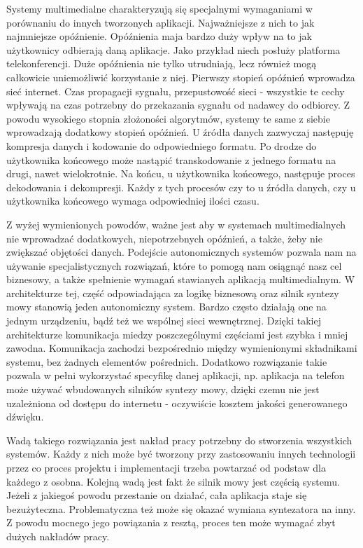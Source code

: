 Systemy multimedialne charakteryzują się specjalnymi wymaganiami w porównaniu do innych tworzonych aplikacji. Najważniejsze z nich to jak najmniejsze opóźnienie. Opóźnienia maja bardzo duży wpływ na to jak użytkownicy odbierają daną aplikacje. Jako przykład niech posłuży platforma telekonferencji. Duże opóźnienia nie tylko utrudniają, lecz również mogą całkowicie uniemożliwić korzystanie z niej. Pierwszy stopień opóźnień wprowadza sieć internet. Czas propagacji sygnału, przepustowość sieci - wszystkie te cechy wpływają na czas potrzebny do przekazania sygnału od nadawcy do odbiorcy. Z powodu wysokiego stopnia złożoności algorytmów, systemy te same z siebie wprowadzają dodatkowy stopień opóźnień. U źródła danych zazwyczaj następuję kompresja danych i kodowanie do odpowiedniego formatu. Po drodze do użytkownika końcowego może nastąpić transkodowanie z jednego formatu na drugi, nawet wielokrotnie. Na końcu, u użytkownika końcowego, następuje proces dekodowania i dekompresji. Każdy z tych procesów czy to u źródła danych, czy u użytkownika końcowego wymaga odpowiedniej ilości czasu. 

Z wyżej wymienionych powodów, ważne jest aby w systemach multimedialnych nie wprowadzać dodatkowych, niepotrzebnych opóźnień, a także, żeby nie zwiększać objętości danych. Podejście autonomicznych systemów pozwala nam na używanie specjalistycznych rozwiązań, które to pomogą nam osiągnąć nasz cel biznesowy, a także spełnienie wymagań stawianych aplikacją multimedialnym. W architekturze tej, część odpowiadająca za logikę biznesową oraz silnik syntezy mowy stanowią jeden autonomiczny system. Bardzo często działają one na jednym urządzeniu, bądź też we wspólnej sieci wewnętrznej. Dzięki takiej architekturze komunikacja miedzy poszczególnymi częściami jest szybka i mniej zawodna. Komunikacja zachodzi bezpośrednio między wymienionymi składnikami systemu, bez żadnych elementów pośrednich. Dodatkowo rozwiązanie takie pozwala w pełni wykorzystać specyfikę danej aplikacji, np. aplikacja na telefon może używać wbudowanych silników syntezy mowy, dzięki czemu nie jest uzależniona od dostępu do internetu - oczywiście  kosztem jakości generowanego dźwięku. 

Wadą takiego rozwiązania jest nakład pracy potrzebny do stworzenia wszystkich systemów. Każdy z nich może być tworzony przy zastosowaniu innych technologii przez co proces projektu i implementacji trzeba powtarzać od podstaw dla każdego z osobna. 
 Kolejną wadą jest fakt że silnik mowy jest częścią systemu. Jeżeli z jakiegoś powodu przestanie on działać, cała aplikacja staje się bezużyteczna. Problematyczna też może się okazać wymiana syntezatora na inny. Z powodu mocnego jego powiązania z resztą, proces ten może wymagać zbyt dużych nakładów pracy.

